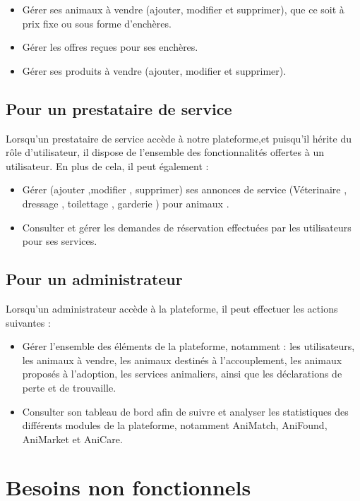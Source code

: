 \begin{itemize}
    \item Gérer ses animaux à vendre (ajouter, modifier et supprimer), que ce soit à prix fixe ou sous forme d’enchères. 
    \item Gérer les offres reçues pour ses enchères.
    \item Gérer ses produits à vendre (ajouter, modifier et supprimer).
\end{itemize} 


\subsection{Pour un prestataire de service} 
Lorsqu’un prestataire de service accède à notre plateforme,et puisqu’il hérite du rôle d’utilisateur, il dispose de l’ensemble des fonctionnalités offertes à un utilisateur. En plus de cela, il peut également : 
\begin{itemize}
    \item Gérer (ajouter ,modifier , supprimer) ses annonces de service (Véterinaire , dressage , toilettage , garderie ) pour animaux . 
    \item Consulter et gérer les demandes de réservation effectuées par les utilisateurs pour ses services.
\end{itemize} 
\subsection{Pour un administrateur}

Lorsqu’un administrateur accède à la plateforme, il peut effectuer les actions suivantes :

\begin{itemize}
    
    \item Gérer l’ensemble des éléments de la plateforme, notamment : les utilisateurs, les animaux à vendre, les animaux destinés à l’accouplement, les animaux proposés à l’adoption, les services animaliers, ainsi que les déclarations de perte et de trouvaille.
    \item Consulter son tableau de bord afin de suivre et analyser les statistiques des différents modules de la plateforme, notamment AniMatch, AniFound, AniMarket et AniCare.
\end{itemize} 
\newpage
\section{Besoins non fonctionnels}

